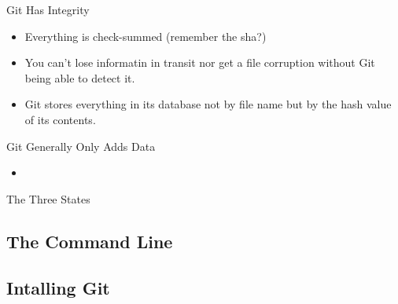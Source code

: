 \begin{frame}[t]{Git Has Integrity}
  \begin{itemize}
    \item Everything is check-summed (remember the sha?)
    \item You can't lose informatin in transit nor get a file corruption without
      Git being able to detect it.
    \item Git stores everything in its database not by file name but by the hash
      value of its contents.
  \end{itemize}
\end{frame}

\begin{frame}[t]{Git Generally Only Adds Data}
  \begin{itemize}
    \item 
  \end{itemize}
\end{frame}

\begin{frame}[t]{The Three States}
\end{frame}

\subsection{The Command Line}
\begin{frame}[t]{}
\end{frame}

\subsection{Intalling Git}
\begin{frame}[t]{}
\end{frame}

\begin{frame}[t]{}
\end{frame}

\begin{frame}[t]{}
\end{frame}

\begin{frame}[t]{}
\end{frame}

\begin{frame}[t]{}
\end{frame}

\begin{frame}[t]{}
\end{frame}

\begin{frame}[t]{}
\end{frame}

